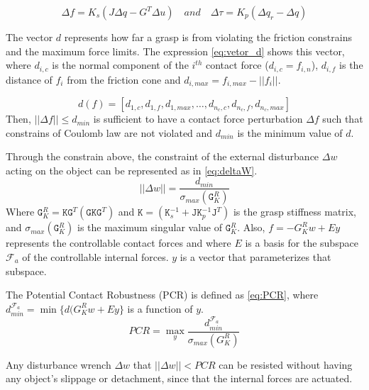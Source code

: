 \begin{equation}\label{eq:force_torque_variation}
     \Delta f = K_s(J \Delta q - G^T\Delta u) \quad and \quad
     \Delta \tau = K_p(\Delta q_r - \Delta q)
 \end{equation}
    
The vector $d$ represents how far a grasp is from violating the friction constrains and the maximum force limits. The expression \eqref{eq:vetor_d} shows this vector, where $d_{i,c}$ is the normal component of the $i^{th}$ contact force ($d_{i,c} = f_{i,n} $), $d_{i,f}$ is the distance of \texttt{$f_i$} from the friction cone and $d_{i,max} = f_{i,max} - ||f_i||$.\par
\begin{equation}\label{eq:vetor_d}
    d(f) = [d_{1,c}, d_{1,f}, d_{1,max}, \dots, d_{n_c,c}, d_{n_c,f}, d_{n_c,max}]
\end{equation}
Then, $||\Delta f|| \le d_{min}$ is sufficient to have a contact force perturbation $\Delta f$ such that constrains of Coulomb law are not violated and $d_{min}$ is the minimum value of $d$.

Through the constrain above, the constraint of the external disturbance $\Delta w$ acting on the object can be represented as in \eqref{eq:deltaW}.
 \begin{equation}\label{eq:deltaW}
     ||\Delta w || = \frac{d_{min}}{\sigma_{max}(\texttt{G}_K^R)}
 \end{equation}
 Where $\texttt{G}_K^R = \texttt{KG}^T(\texttt{GKG}^T)$ and $ \texttt{K} =( \texttt{K}_s^{-1} + \texttt{JK}_p^{-1}\texttt{J}^T)$ is the grasp stiffness matrix, and $\sigma_{max}(\texttt{G}_K^R)$ is the maximum singular value of $\texttt{G}_K^R$.
 Also, $f = -G_K^R w + Ey$ represents the controllable contact forces and where $E$ is a basis for the subspace $\mathcal{F}_a$ of the controllable internal forces. $y$ is a vector that parameterizes that subspace.
 \par
 The Potential Contact Robustness (PCR) is defined as \eqref{eq:PCR}, where $d_{min}^{\mathcal{F}_a}= \min\{d(G_K^R w+ Ey\}$ is a function of $y$.
 \begin{equation}\label{eq:PCR}
    PCR = \max_y\frac{d_{min}^{\mathcal{F}_a}}{\sigma_{max}(G_K^R)}
\end{equation} 
 
Any disturbance wrench $\Delta w$ that $||\Delta w||< PCR$ can be resisted without having any object's slippage or detachment, since that the internal forces are actuated. 

